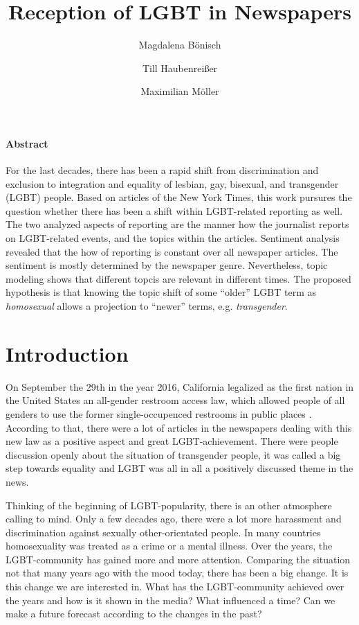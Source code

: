 \documentclass[10pt,a4paper,twocolumn]{scrartcl}
\title{Reception of LGBT in Newspapers}
\author{Magdalena Bönisch \and Till Haubenreißer \and Maximilian Möller}
\begin{document}
\onehalfspacing

\maketitle

{\small
\paragraph*{Abstract} For the last decades, there has been a rapid shift from discrimination and exclusion to integration and equality of lesbian, gay, bisexual, and transgender (LGBT) people. Based on articles of the New York Times, this work pursures the question whether there has been a shift within LGBT-related reporting as well. The two analyzed aspects of reporting are the manner how the journalist reports on LGBT-related events, and the topics within the articles. Sentiment analysis revealed that the how of reporting is constant over all newspaper articles. The sentiment is mostly determined by the newspaper genre. Nevertheless, topic modeling shows that different topcis are relevant in different times. The proposed hypothesis is that knowing the topic shift of some ``older'' LGBT term as \textit{homosexual} allows a projection to ``newer'' terms, e.g. \textit{transgender}.
}


\section{Introduction}
On September the 29th in the year 2016, California legalized as the first nation in the United States an all-gender restroom access law, which allowed people of all genders to use the former single-occupenced restrooms in public places \citep{Ring:2016}. According to that, there were a lot of articles in the newspapers dealing with this new law as a positive aspect and great LGBT-achievement. There were people discussion openly about the situation of transgender people, it was called a big step towards equality and LGBT was all in all a positively discussed theme in the news.

Thinking of the beginning of LGBT-popularity, there is an other atmosphere calling to mind. Only a few decades ago, there were a lot more harassment and discrimination against sexually other-orientated people. In many countries homosexuality was treated as a crime or a mental illness. Over the years, the LGBT-community has gained more and more attention. Comparing the situation not that many years ago with the mood today, there has been a big change. It is this change we are interested in. What has the LGBT-community achieved over the years and how is it shown in the media? What influenced a time? Can we make a future forecast according to the changes in the past?
\end{document}

